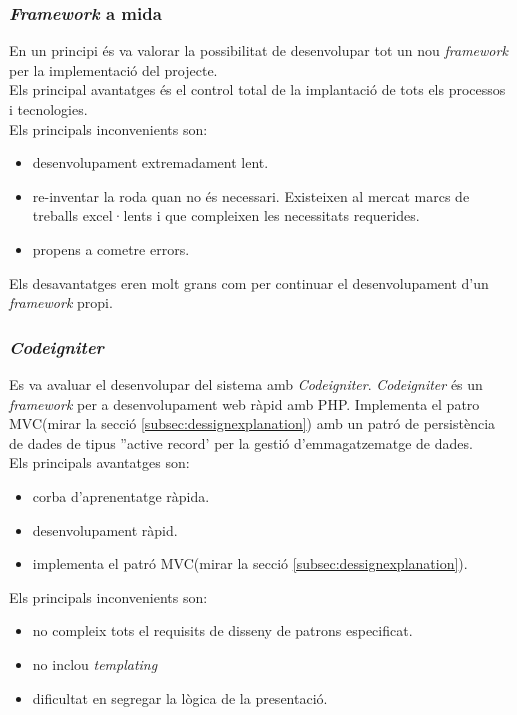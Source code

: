 \subsubsection{\textit{Framework} a mida}
En un principi \'{e}s va valorar la possibilitat de desenvolupar tot un nou \textit{framework} per la implementaci\'{o} del projecte.\\

Els principal avantatges \'{e}s el control total de la implantaci\'{o} de tots els processos i tecnologies.\\

Els principals inconvenients son:
\begin{itemize} 
\item desenvolupament extremadament lent. 
\item re-inventar la roda quan no \'{e}s necessari. Existeixen al mercat marcs de treballs excel·lents i que compleixen les necessitats requerides.
\item propens a cometre errors.
\end{itemize} 

Els desavantatges eren molt grans com per continuar el desenvolupament d'un \textit{framework} propi.

\subsubsection{\textit{Codeigniter}}
Es va avaluar el desenvolupar del sistema amb \textit{Codeigniter}. \textit{Codeigniter} \'{e}s un \textit{framework} per a desenvolupament web r\`{a}pid amb PHP.\cite{codeigniter} Implementa el patro MVC(mirar la secció \ref{subsec:dessignexplanation}) amb un patró de persistència de dades de tipus ''active record' per la gesti\'{o} d'emmagatzematge de dades.\cite{activerecord}\\

Els principals avantatges son:
\begin{itemize}
\item corba d'aprenentatge r\`{a}pida.
\item desenvolupament r\`{a}pid.
\item implementa el patr\'{o} MVC(mirar la secció \ref{subsec:dessignexplanation}).
\end{itemize}

Els principals inconvenients son:
\begin{itemize}
\item no compleix tots el requisits de disseny de patrons especificat.
\item no inclou \textit{templating}
\item dificultat en segregar la l\`{o}gica de la presentaci\'{o}.
\end{itemize}

